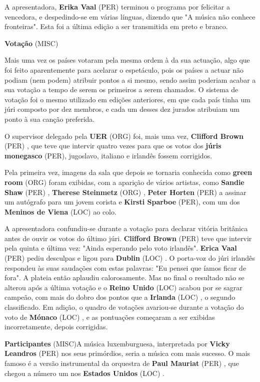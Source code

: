 \documentclass[12pt,a4paper]{article}
\begin{document}
A apresentadora, \textbf{Erika Vaal} (PER) terminou o programa por felicitar a vencedora, e despedindo-se em várias línguas, dizendo que "A música não conhece fronteiras". Esta foi a última edição a ser transmitida em preto e branco.



\textbf{Votação} (MISC)

Mais uma vez os países votaram pela mesma ordem à da sua actuação, algo que foi feito aparentemente para acelarar o espetáculo, pois os países a actuar não podiam (nem podem) atribuir pontos a si mesmo, sendo assim poderiam acabar a sua votação a tempo de serem os primeiros a serem chamados. O sistema de votação foi o mesmo utilizado em edições anteriores, em que cada país tinha um júri composto por dez membros, e cada um desses dez jurados atribuiam um ponto à sua canção preferida.

O supervisor delegado pela \textbf{UER} (ORG) foi, mais uma vez, \textbf{Clifford Brown} (PER) , que teve que intervir quatro vezes para que os votos dos \textbf{júris monegasco} (PER), jugoslavo, italiano e irlandês fossem corrigidos.

Pela primeira vez, imagens da sala que depois se tornaria conhecida como \textbf{green room} (ORG) foram exibidas, com a aparição de vários artistas, como \textbf{Sandie Shaw} (PER) , \textbf{Therese Steinmetz} (ORG) , \textbf{Peter Horten} (PER) a assinar um autógrafo para um jovem corista e \textbf{Kirsti Sparboe} (PER), com um dos \textbf{Meninos de Viena} (LOC) ao colo.

A apresentadora confundiu-se durante a votação para declarar vitória britânica antes de ouvir os votos do último júri. \textbf{Clifford Brown} (PER) teve que intervir pela quinta e última vez: "Ainda esperando pelo voto irlandês". \textbf{Erica Vaal} (PER) pediu desculpas e ligou para \textbf{Dublin} (LOC) . O porta-voz do júri irlandês respondeu às suas saudações com estas palavras: "Eu pensei que íamos ficar de fora". A plateia então aplaudiu calorosamente. Mas no final o resultado não se alterou após a última votação e o \textbf{Reino Unido} (LOC) acabou por se sagrar campeão, com mais do dobro dos pontos que a \textbf{Irlanda} (LOC) , o segundo classificado. Em adição, o quadro de votações avariou-se durante a votação do voto de \textbf{Mónaco} (LOC) , e as pontuações começaram a ser exibidas incorretamente, depois corrigidas.



\textbf{Participantes} (MISC)A música luxemburguesa, interpretada por \textbf{Vicky Leandros} (PER) nos seus primórdios, seria a música com mais sucesso. O mais famoso é a versão instrumental da orquestra de \textbf{Paul Mauriat} (PER) , que chegou a número um nos \textbf{Estados Unidos} (LOC) .
\end{document}
